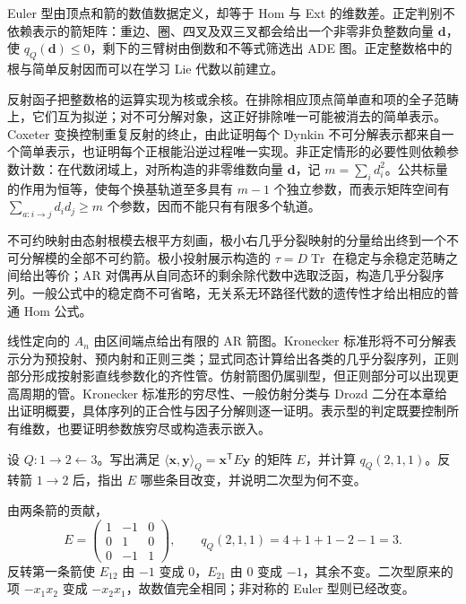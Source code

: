 







\begin{chaptersummary}
	Euler 型由顶点和箭的数值数据定义，却等于 Hom 与 Ext 的维数差。正定判别不依赖表示的箭矩阵：重边、圈、四叉及双三叉都会给出一个非零非负整数向量 \(\mathbf d\)，使 \(q_Q(\mathbf d)\leq0\)，剩下的三臂树由倒数和不等式筛选出 ADE 图。正定整数格中的根与简单反射因而可以在学习 Lie 代数以前建立。

	\ProseParagraphBreak

	反射函子把整数格的运算实现为核或余核。在排除相应顶点简单直和项的全子范畴上，它们互为拟逆；对不可分解对象，这正好排除唯一可能被消去的简单表示。Coxeter 变换控制重复反射的终止，由此证明每个 Dynkin 不可分解表示都来自一个简单表示，也证明每个正根能沿逆过程唯一实现。非正定情形的必要性则依赖参数计数：在代数闭域上，对所构造的非零维数向量 \(\mathbf d\)，记 \(m=\sum_i d_i^2\)。公共标量的作用为恒等，使每个换基轨道至多具有 \(m-1\) 个独立参数，而表示矩阵空间有 \(\sum_{a:i\to j}d_id_j\ge m\) 个参数，因而不能只有有限多个轨道。

	\ProseParagraphBreak

	不可约映射由态射根模去根平方刻画，极小右几乎分裂映射的分量给出终到一个不可分解模的全部不可约箭。极小投射展示构造的 \(\tau=D\operatorname{Tr}\) 在稳定与余稳定范畴之间给出等价；AR 对偶再从自同态环的剩余除代数中选取泛函，构造几乎分裂序列。一般公式中的稳定商不可省略，无关系无环路径代数的遗传性才给出相应的普通 Hom 公式。

	\ProseParagraphBreak

	线性定向的 \(A_n\) 由区间端点给出有限的 AR 箭图。Kronecker 标准形将不可分解表示分为预投射、预内射和正则三类；显式同态计算给出各类的几乎分裂序列，正则部分形成按射影直线参数化的齐性管。仿射箭图仍属驯型，但正则部分可以出现更高周期的管。Kronecker 标准形的穷尽性、一般仿射分类与 Drozd 二分在本章给出证明概要，具体序列的正合性与因子分解则逐一证明。表示型的判定既要控制所有维数，也要证明参数族穷尽或构造表示嵌入。
\end{chaptersummary}

\BookExercises

\begin{optionalexercise}\label{b5:ex:10-euler-orientation}
	设 \(Q:1\to2\leftarrow3\)。写出满足 \(\langle\mathbf x,\mathbf y\rangle_Q=\mathbf x^{\mathsf T}E\mathbf y\) 的矩阵 \(E\)，并计算 \(q_Q(2,1,1)\)。反转箭 \(1\to2\) 后，指出 \(E\) 哪些条目改变，并说明二次型为何不变。
\end{optionalexercise}
\begin{solution}
	由两条箭的贡献，
	\[
		E=\begin{pmatrix}1&-1&0\\0&1&0\\0&-1&1\end{pmatrix},
		\qquad q_Q(2,1,1)=4+1+1-2-1=3.
	\]
	反转第一条箭使 \(E_{12}\) 由 \(-1\) 变成 \(0\)，\(E_{21}\) 由 \(0\) 变成 \(-1\)，其余不变。二次型原来的项 \(-x_1x_2\) 变成 \(-x_2x_1\)，故数值完全相同；非对称的 Euler 型则已经改变。
\end{solution}

